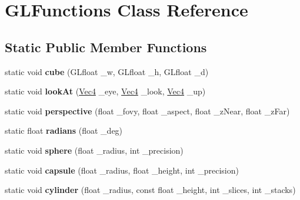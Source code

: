 \hypertarget{classGLFunctions}{}\section{G\+L\+Functions Class Reference}
\label{classGLFunctions}
\subsection*{Static Public Member Functions}
\begin{DoxyCompactItemize}
\item 
static void {\bfseries cube} (G\+Lfloat \+\_\+w, G\+Lfloat \+\_\+h, G\+Lfloat \+\_\+d)\hypertarget{classGLFunctions_aee5b3f390ec85d0d414292d0ed7255a3}{}\label{classGLFunctions_aee5b3f390ec85d0d414292d0ed7255a3}

\item 
static void {\bfseries look\+At} (\hyperlink{classVec4}{Vec4} \+\_\+eye, \hyperlink{classVec4}{Vec4} \+\_\+look, \hyperlink{classVec4}{Vec4} \+\_\+up)\hypertarget{classGLFunctions_a1c20e262bc92cfecb3d9465b8f87f0f6}{}\label{classGLFunctions_a1c20e262bc92cfecb3d9465b8f87f0f6}

\item 
static void {\bfseries perspective} (float \+\_\+fovy, float \+\_\+aspect, float \+\_\+z\+Near, float \+\_\+z\+Far)\hypertarget{classGLFunctions_abd3c398c9beea93c4f213e8f8ad53e06}{}\label{classGLFunctions_abd3c398c9beea93c4f213e8f8ad53e06}

\item 
static float {\bfseries radians} (float \+\_\+deg)\hypertarget{classGLFunctions_a5a15e7a581ababd7bdc810d15422612d}{}\label{classGLFunctions_a5a15e7a581ababd7bdc810d15422612d}

\item 
static void {\bfseries sphere} (float \+\_\+radius, int \+\_\+precision)\hypertarget{classGLFunctions_ab6916b1ff59f14bd1926c6b56069b460}{}\label{classGLFunctions_ab6916b1ff59f14bd1926c6b56069b460}

\item 
static void {\bfseries capsule} (float \+\_\+radius, float \+\_\+height, int \+\_\+precision)\hypertarget{classGLFunctions_a1dec6aa52e2bda58ab28bba2b574243c}{}\label{classGLFunctions_a1dec6aa52e2bda58ab28bba2b574243c}

\item 
static void {\bfseries cylinder} (float \+\_\+radius, const float \+\_\+height, int \+\_\+slices, int \+\_\+stacks)\hypertarget{classGLFunctions_ae4ccc483de859724e6fe8b8152b7b0af}{}\label{classGLFunctions_ae4ccc483de859724e6fe8b8152b7b0af}


\end{DoxyCompactItemize}
